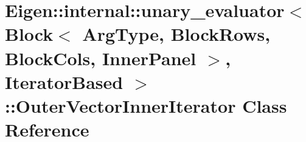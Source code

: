 \hypertarget{class_eigen_1_1internal_1_1unary__evaluator_3_01_block_3_01_arg_type_00_01_block_rows_00_01_bloc652d26bcece9990189dc15f4df1c964f}{}\section{Eigen\+:\+:internal\+:\+:unary\+\_\+evaluator$<$ Block$<$ Arg\+Type, Block\+Rows, Block\+Cols, Inner\+Panel $>$, Iterator\+Based $>$\+:\+:Outer\+Vector\+Inner\+Iterator Class Reference}
\label{class_eigen_1_1internal_1_1unary__evaluator_3_01_block_3_01_arg_type_00_01_block_rows_00_01_bloc652d26bcece9990189dc15f4df1c964f}
